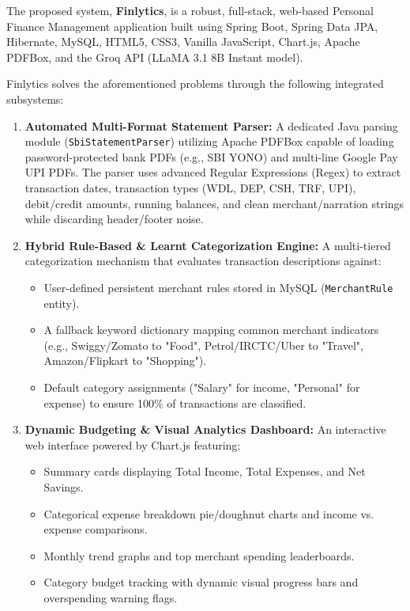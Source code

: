 \documentclass[../Project-Report-Main.tex]{subfiles}
\begin{document}
The proposed system, \textbf{Finlytics}, is a robust, full-stack, web-based Personal Finance Management application built using Spring Boot, Spring Data JPA, Hibernate, MySQL, HTML5, CSS3, Vanilla JavaScript, Chart.js, Apache PDFBox, and the Groq API (LLaMA 3.1 8B Instant model).

Finlytics solves the aforementioned problems through the following integrated subsystems:

\begin{enumerate}
 \item \textbf{Automated Multi-Format Statement Parser:} A dedicated Java parsing module (\texttt{SbiStatementParser}) utilizing Apache PDFBox capable of loading password-protected bank PDFs (e.g., SBI YONO) and multi-line Google Pay UPI PDFs. The parser uses advanced Regular Expressions (Regex) to extract transaction dates, transaction types (WDL, DEP, CSH, TRF, UPI), debit/credit amounts, running balances, and clean merchant/narration strings while discarding header/footer noise.

 \item \textbf{Hybrid Rule-Based \& Learnt Categorization Engine:} A multi-tiered categorization mechanism that evaluates transaction descriptions against:
 \begin{itemize}
   \item User-defined persistent merchant rules stored in MySQL (\texttt{MerchantRule} entity).
   \item A fallback keyword dictionary mapping common merchant indicators (e.g., Swiggy/Zomato to "Food", Petrol/IRCTC/Uber to "Travel", Amazon/Flipkart to "Shopping").
   \item Default category assignments ("Salary" for income, "Personal" for expense) to ensure 100\% of transactions are classified.
 \end{itemize}

 \item \textbf{Dynamic Budgeting \& Visual Analytics Dashboard:} An interactive web interface powered by Chart.js featuring:
 \begin{itemize}
   \item Summary cards displaying Total Income, Total Expenses, and Net Savings.
   \item Categorical expense breakdown pie/doughnut charts and income vs. expense comparisons.
   \item Monthly trend graphs and top merchant spending leaderboards.
   \item Category budget tracking with dynamic visual progress bars and overspending warning flags.
 \end{itemize}


\end{enumerate}
\end{document}
